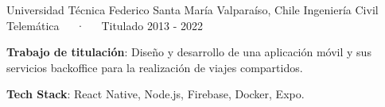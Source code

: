 

\begin{cventries}

  \cventry
    {Universidad Técnica Federico Santa María} %
    {Valparaíso, Chile} %
    {Ingeniería Civil Telemática~~~·~~~Titulado} %
    {2013 - 2022} %
    {
      \begin{cvitems} %
        \item {\textbf{Trabajo de titulación}: Diseño y desarrollo de una aplicación móvil y sus servicios backoffice para la realización de viajes compartidos.}
        \item {\textbf{Tech Stack}: React Native, Node.js, Firebase, Docker, Expo.}
      \end{cvitems}
    }

\end{cventries}
